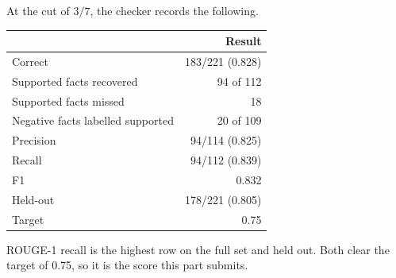 At the cut of \(3/7\), the checker records the following.

\begin{center}
\small
\begin{tabular}{@{}lr@{}}
\toprule
 & Result \\
\midrule
Correct & 183/221 (0.828) \\
Supported facts recovered & 94 of 112 \\
Supported facts missed & 18 \\
Negative facts labelled supported & 20 of 109 \\
Precision & 94/114 (0.825) \\
Recall & 94/112 (0.839) \\
F1 & 0.832 \\
Held-out & 178/221 (0.805) \\
Target & 0.75 \\
\bottomrule
\end{tabular}
\end{center}

ROUGE-1 recall is the highest row on the full set and held out. Both clear the target of 0.75, so it is the score this part submits.

